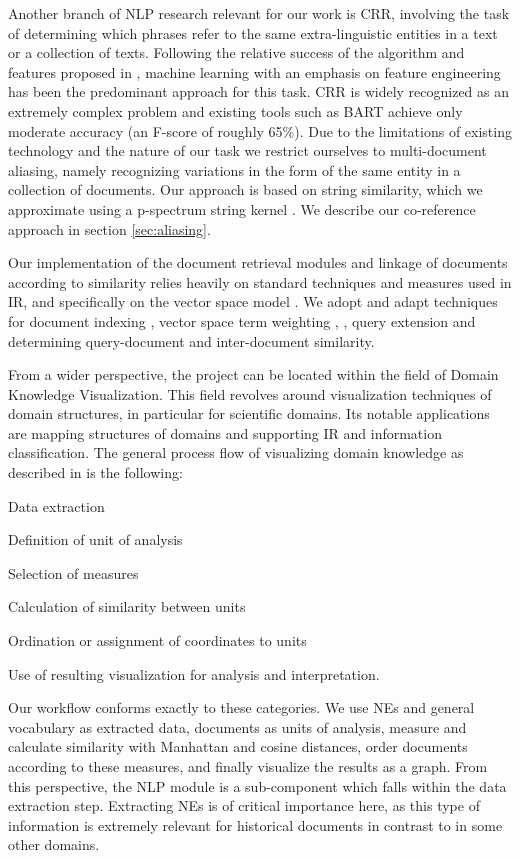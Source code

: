 Another branch of NLP research relevant for our work is CRR, involving the task of determining which phrases refer to the same extra-linguistic entities in a text or a collection of texts.
Following the relative success of the algorithm and features proposed in \cite {soon2001coreference}, machine learning 
with an emphasis on feature engineering has been the predominant approach for this task. CRR is widely 
recognized as an extremely complex problem and existing tools such as BART \cite{bart} achieve only moderate accuracy (an F-score of roughly 65\%). Due to the limitations of existing technology and the nature of our task we restrict ourselves to multi-document aliasing, namely recognizing variations in the form of the same entity in a collection of documents. Our approach is based on string similarity, 
which we approximate using a p-spectrum string kernel \cite{kernels2004}. We describe our co-reference approach in section \ref{sec:aliasing}.

Our implementation of the document retrieval modules and linkage of documents according to similarity relies heavily on standard techniques 
and measures used in IR, and specifically on the vector space model \cite{ir2008}. We adopt and adapt techniques for 
document indexing \cite{indexing1999}, vector space term weighting \cite{jones2004}, \cite{salton1971}, query extension and determining query-document and 
inter-document similarity. 

From a wider perspective, the project can be located within the field of Domain Knowledge Visualization. This field revolves around visualization
techniques of domain structures, in particular for scientific domains. Its notable applications are mapping structures of domains and supporting
IR and information classification.
The general process flow of visualizing domain knowledge as described in
\cite{visualizing2003} is the following: 
\begin{description}
\item Data extraction 
\item Definition of unit of analysis 
\item Selection of measures 
\item Calculation of similarity between units 
\item Ordination or assignment of coordinates to units 
\item Use of resulting visualization for analysis and interpretation.
\end{description}
Our workflow conforms exactly to these categories. We use NEs and general vocabulary as extracted data, documents as units of analysis, measure and calculate similarity with Manhattan and cosine distances, order documents according to these measures, and finally visualize the results as a graph.
From this perspective, the NLP module is a sub-component which falls within the data extraction step. Extracting NEs is of critical importance
here, as this type of information is extremely relevant for historical documents in contrast to in some other domains.  

